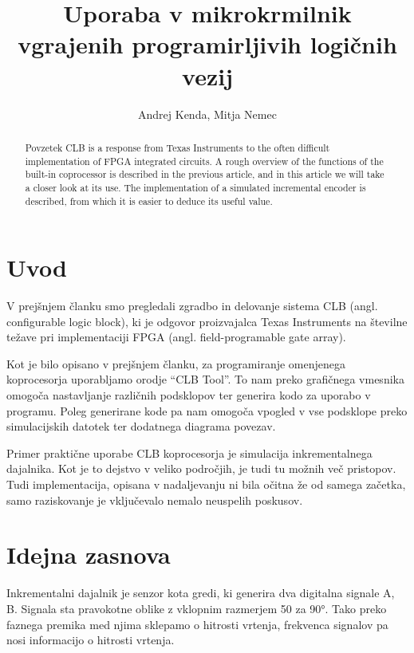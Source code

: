 \documentclass[a4paper]{article}
\begin{document}
\begin{sloppypar}
\title{Uporaba v mikrokrmilnik vgrajenih programirljivih logičnih vezij}

\author{Andrej Kenda, Mitja Nemec}



\maketitle



\begin{abstract}{Povzetek}
CLB is a response from Texas Instruments to the often difficult implementation
of FPGA integrated circuits. A rough overview of the functions of the built-in
coprocessor is described in the previous article, and in this article we will
take a closer look at its use. The implementation of a simulated incremental
encoder is described, from which it is easier to deduce its useful value.
\end{abstract}


\section{Uvod}
V prejšnjem članku smo pregledali zgradbo in delovanje sistema CLB (angl.
configurable logic block), ki je odgovor proizvajalca Texas Instruments na
številne težave pri implementaciji FPGA (angl. field-programable gate array). 

Kot je bilo opisano v prejšnjem članku, za programiranje omenjenega
koprocesorja uporabljamo orodje ``CLB Tool''. To nam preko grafičnega vmesnika
omogoča nastavljanje različnih podsklopov ter generira kodo za uporabo v
programu. Poleg generirane kode pa nam omogoča vpogled v vse podsklope preko
simulacijskih datotek ter dodatnega diagrama povezav.

Primer praktične uporabe CLB koprocesorja je simulacija inkrementalnega
dajalnika. Kot je to dejstvo v veliko področjih, je tudi tu možnih več
pristopov. Tudi implementacija, opisana v nadaljevanju ni bila očitna že od
samega začetka, samo raziskovanje je vključevalo nemalo neuspelih poskusov.


\section{Idejna zasnova}
Inkrementalni dajalnik je senzor kota gredi, ki generira dva digitalna signale A, B. 
Signala sta pravokotne oblike z vklopnim razmerjem 50%
za 90°. Tako preko faznega premika med njima sklepamo o hitrosti vrtenja, frekvenca
signalov pa nosi informacijo o hitrosti vrtenja.


\end{sloppypar}
\end{document}
